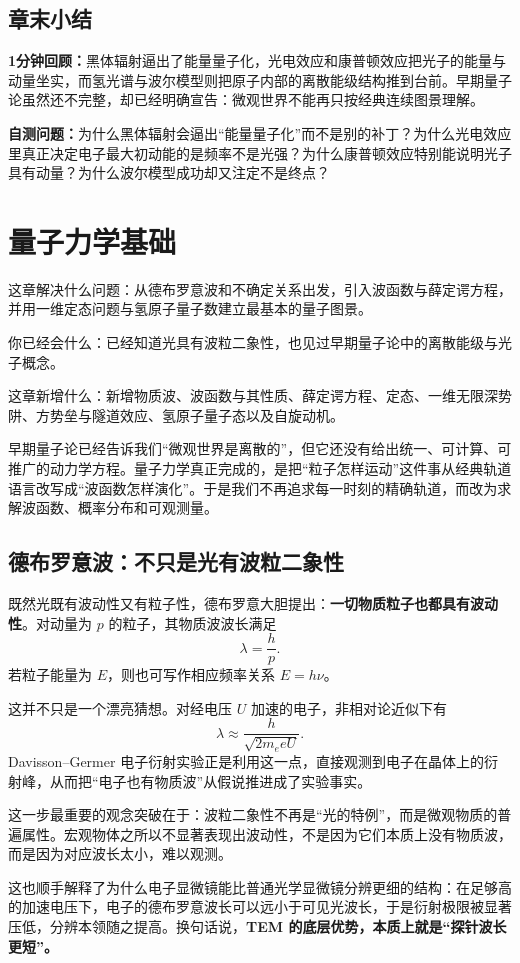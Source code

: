 \documentclass[lang=cn,11pt]{elegantbook}
\newcommand{\bridge}[1]{\begin{note}#1\end{note}}
\newcommand{\chapterroadmap}[3]{%
\begin{introduction}
  \item {\heiti 这章解决什么问题：}#1
  \item {\heiti 你已经会什么：}#2
  \item {\heiti 这章新增什么：}#3
\end{introduction}}
\newcommand{\summaryline}[1]{\par\noindent\textbf{1分钟回顾：}#1\par}
\newcommand{\chapterselfcheck}[1]{\par\noindent\textbf{自测问题：}#1\par}
\begin{document}
\section{章末小结}

\summaryline{黑体辐射逼出了能量量子化，光电效应和康普顿效应把光子的能量与动量坐实，而氢光谱与波尔模型则把原子内部的离散能级结构推到台前。早期量子论虽然还不完整，却已经明确宣告：微观世界不能再只按经典连续图景理解。}
\chapterselfcheck{为什么黑体辐射会逼出“能量量子化”而不是别的补丁？为什么光电效应里真正决定电子最大初动能的是频率不是光强？为什么康普顿效应特别能说明光子具有动量？为什么波尔模型成功却又注定不是终点？}

\chapter{量子力学基础}

\chapterroadmap
{从德布罗意波和不确定关系出发，引入波函数与薛定谔方程，并用一维定态问题与氢原子量子数建立最基本的量子图景。}
{已经知道光具有波粒二象性，也见过早期量子论中的离散能级与光子概念。}
{新增物质波、波函数与其性质、薛定谔方程、定态、一维无限深势阱、方势垒与隧道效应、氢原子量子态以及自旋动机。}

\bridge{早期量子论已经告诉我们“微观世界是离散的”，但它还没有给出统一、可计算、可推广的动力学方程。量子力学真正完成的，是把“粒子怎样运动”这件事从经典轨道语言改写成“波函数怎样演化”。于是我们不再追求每一时刻的精确轨道，而改为求解波函数、概率分布和可观测量。}

\section{德布罗意波：不只是光有波粒二象性}

既然光既有波动性又有粒子性，德布罗意大胆提出：\textbf{一切物质粒子也都具有波动性}。对动量为 \(p\) 的粒子，其物质波波长满足
\[
\lambda=\frac{h}{p}.
\]
若粒子能量为 \(E\)，则也可写作相应频率关系 \(E=h\nu\)。

这并不只是一个漂亮猜想。对经电压 \(U\) 加速的电子，非相对论近似下有
\[
\lambda\approx \frac{h}{\sqrt{2m_e eU}}.
\]
Davisson--Germer 电子衍射实验正是利用这一点，直接观测到电子在晶体上的衍射峰，从而把“电子也有物质波”从假说推进成了实验事实。

这一步最重要的观念突破在于：波粒二象性不再是“光的特例”，而是微观物质的普遍属性。宏观物体之所以不显著表现出波动性，不是因为它们本质上没有物质波，而是因为对应波长太小，难以观测。

\begin{remark}
这也顺手解释了为什么电子显微镜能比普通光学显微镜分辨更细的结构：在足够高的加速电压下，电子的德布罗意波长可以远小于可见光波长，于是衍射极限被显著压低，分辨本领随之提高。换句话说，\textbf{TEM 的底层优势，本质上就是“探针波长更短”。}
\end{remark}
\end{document}
